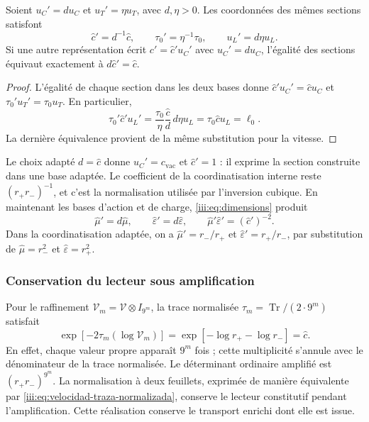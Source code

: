 \begin{proposition}
Soient $u_C'=d u_C$ et $u_T'=\eta u_T$, avec $d,\eta>0$. Les coordonnées des mêmes sections satisfont
\begin{equation}
 \widehat c'=d^{-1}\widehat c,
 \qquad \tau_0'=\eta^{-1}\tau_0,
 \qquad u_L'=d\eta u_L.
 \label{iii:eq:velocidad-cambio-carta}
\end{equation}
Si une autre représentation écrit $c'=\widehat c' u_C'$ avec $u_C'=d u_C$,
l’égalité des sections équivaut exactement à $d\widehat c'=\widehat c$.
\end{proposition}
\begin{proof}
L'égalité de chaque section dans les deux bases donne $\widehat c'u_C'=\widehat c u_C$ et $\tau_0'u_T'=\tau_0u_T$. En particulier,
\[
 \tau_0'\widehat c'u_L'
 =\frac{\tau_0}{\eta}\frac{\widehat c}{d}\,d\eta u_L
 =\tau_0\widehat c u_L=\ell_0.
\]
La dernière équivalence provient de la même substitution pour la vitesse.
\end{proof}

Le choix adapté $d=\widehat c$ donne $u_C'=c_{\mathrm{vac}}$ et
$\widehat c'=1$ : il exprime la section construite dans une base adaptée.
Le coefficient de la coordinatisation interne reste $(r_+r_-)^{-1}$, et c’est
la normalisation utilisée par l’inversion cubique. En maintenant les
bases d’action et de charge, \eqref{iii:eq:dimensions} produit
\[
 \widehat\mu'=d\widehat\mu,\qquad
 \widehat\varepsilon'=d\widehat\varepsilon,\qquad
 \widehat\mu'\widehat\varepsilon'=(\widehat c')^{-2}.
\]
Dans la coordinatisation adaptée, on a $\widehat\mu'=r_-/r_+$ et
$\widehat\varepsilon'=r_+/r_-$, par substitution de
$\widehat\mu=r_-^2$ et $\widehat\varepsilon=r_+^2$.

\subsubsection{Conservation du lecteur sous amplification}

Pour le raffinement $\mathcal V_m=\mathcal V\otimes I_{9^m}$, la trace normalisée $\tau_m=\operatorname{Tr}/(2\cdot9^m)$ satisfait
\begin{equation}
 \exp[-2\tau_m(\log\mathcal V_m)]
 =\exp[-\log r_+-\log r_-]=\widehat c.
 \label{iii:eq:velocidad-traza-normalizada}
\end{equation}
En effet, chaque valeur propre apparaît $9^m$ fois ; cette multiplicité
s’annule avec le dénominateur de la trace normalisée. Le déterminant
ordinaire amplifié est $(r_+r_-)^{9^m}$. La normalisation à deux feuillets,
exprimée de manière équivalente par \eqref{iii:eq:velocidad-traza-normalizada},
conserve le lecteur constitutif pendant l’amplification. Cette
réalisation conserve le transport enrichi dont elle est issue.
